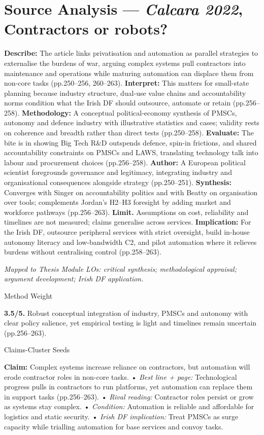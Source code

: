 \section*{Source Analysis — \textit{Calcara 2022}, Contractors or robots?}
\textbf{Describe:} The article links privatisation and automation as parallel strategies to externalise the burdens of war, arguing complex systems pull contractors into maintenance and operations while maturing automation can displace them from non-core tasks (pp.250–256, 260–263).
\textbf{Interpret:} This matters for small-state planning because industry structure, dual-use value chains and accountability norms condition what the Irish DF should outsource, automate or retain (pp.256–258).
\textbf{Methodology:} A conceptual political-economy synthesis of PMSCs, autonomy and defence industry with illustrative statistics and cases; validity rests on coherence and breadth rather than direct tests (pp.250–258).
\textbf{Evaluate:} The bite is in showing Big Tech R&D outspends defence, spin-in frictions, and shared accountability constraints on PMSCs and LAWS, translating technology talk into labour and procurement choices (pp.256–258).
\textbf{Author:} A European political scientist foregrounds governance and legitimacy, integrating industry and organisational consequences alongside strategy (pp.250–251).
\textbf{Synthesis:} Converges with Singer on accountability politics and with Beatty on organisation over tools; complements Jordan’s H2–H3 foresight by adding market and workforce pathways (pp.256–263).
\textbf{Limit.} Assumptions on cost, reliability and timelines are not measured; claims generalise across services. \textbf{Implication:} For the Irish DF, outsource peripheral services with strict oversight, build in-house autonomy literacy and low-bandwidth C2, and pilot automation where it relieves burdens without centralising control (pp.258–263).

\textit{Mapped to Thesis Module LOs: critical synthesis; methodological appraisal; argument development; Irish DF application.}

Method Weight

\textbf{3.5/5.} Robust conceptual integration of industry, PMSCs and autonomy with clear policy salience, yet empirical testing is light and timelines remain uncertain (pp.256–263).

Claims-Cluster Seeds

\textbf{Claim:} Complex systems increase reliance on contractors, but automation will erode contractor roles in non-core tasks.
• \emph{Best line + page:} Technological progress pulls in contractors to run platforms, yet automation can replace them in support tasks (pp.256–263).
• \emph{Rival reading:} Contractor roles persist or grow as systems stay complex.
• \emph{Condition:} Automation is reliable and affordable for logistics and static security.
• \emph{Irish DF implication:} Treat PMSCs as surge capacity while trialling automation for base services and convoy tasks.

